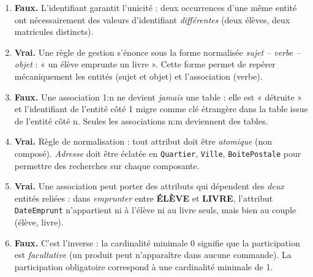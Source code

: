 \documentclass[11pt]{article}
\begin{document}
\begin{corrige}
\begin{enumerate}
  \item \textbf{Faux.} L'identifiant garantit l'unicité : deux occurrences d'une même entité ont nécessairement des valeurs d'identifiant \emph{différentes} (deux élèves, deux matricules distincts).
  \item \textbf{Vrai.} Une règle de gestion s'énonce sous la forme normalisée \emph{sujet -- verbe -- objet} : « un élève emprunte un livre ». Cette forme permet de repérer mécaniquement les entités (sujet et objet) et l'association (verbe).
  \item \textbf{Faux.} Une association 1:n ne devient \emph{jamais} une table : elle est « détruite » et l'identifiant de l'entité côté 1 migre comme clé étrangère dans la table issue de l'entité côté n. Seules les associations n:m deviennent des tables.
  \item \textbf{Vrai.} Règle de normalisation : tout attribut doit être \emph{atomique} (non composé). \emph{Adresse} doit être éclatée en \texttt{Quartier}, \texttt{Ville}, \texttt{BoitePostale} pour permettre des recherches sur chaque composante.
  \item \textbf{Vrai.} Une association peut porter des attributs qui dépendent des \emph{deux} entités reliées : dans \emph{emprunter} entre \textbf{ÉLÈVE} et \textbf{LIVRE}, l'attribut \texttt{DateEmprunt} n'appartient ni à l'élève ni au livre seuls, mais bien au couple (élève, livre).
  \item \textbf{Faux.} C'est l'inverse : la cardinalité minimale 0 signifie que la participation est \emph{facultative} (un produit peut n'apparaître dans aucune commande). La participation obligatoire correspond à une cardinalité minimale de 1.
\end{enumerate}
\end{corrige}
\end{document}
